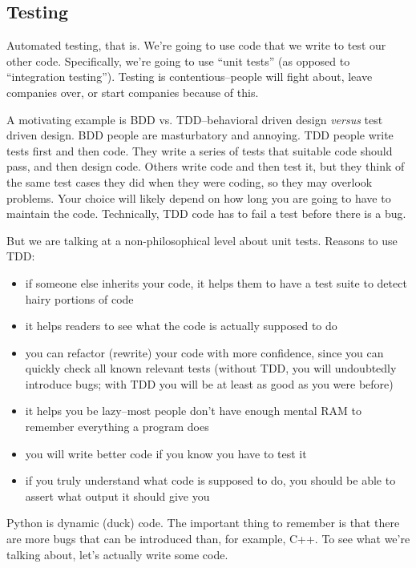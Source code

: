 \documentclass[12pt,letter]{article}
\begin{document}
\subsection{Testing}

Automated testing, that is. We're going to use code that we write to
test our other code. Specifically, we're going to use ``unit tests''
(as opposed to ``integration testing''). Testing is
contentious--people will fight about, leave companies over, or start
companies because of this. 

A motivating example is BDD vs. TDD--behavioral driven design
\emph{versus} test driven design. BDD people are masturbatory and
annoying. TDD people write tests first and then code. They write a
series of tests that suitable code should pass, and then design
code. Others write code and then test it, but they think of the same
test cases they did when they were coding, so they may overlook
problems. Your choice will likely depend on how long you are going to
have to maintain the code. Technically, TDD code has to fail a test
before there is a bug.

But we are talking at a non-philosophical level about unit
tests. Reasons to use TDD:

\begin{itemize}
\item if someone else inherits your code, it helps them to have a test
  suite to detect hairy portions of code
\item it helps readers to see what the code is actually supposed to do
\item you can refactor (rewrite) your code with more confidence, since
  you can quickly check all known relevant tests (without TDD, you
  will undoubtedly introduce bugs; with TDD you will be at least as
  good as you were before) %
\item it helps you be lazy--most people don't have enough mental RAM
  to remember everything a program does
\item you will write better code if you know you have to test it
\item if you truly understand what code is supposed to do, you should
  be able to assert what output it should give you
\end{itemize}

Python is dynamic (duck) code. The important thing to remember is that
there are more bugs that can be introduced than, for example, C++. To
see what we're talking about, let's actually write some code.
\end{document}
